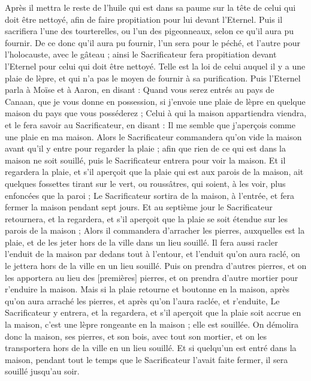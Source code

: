\begin{multicols}{2}
Après il mettra le reste de l'huile qui est dans sa paume sur la tête de celui qui doit être nettoyé, afin de faire propitiation pour lui devant l'Eternel.
Puis il sacrifiera l'une des tourterelles, ou l'un des pigeonneaux, selon ce qu'il aura pu fournir.
De ce donc qu'il aura pu fournir, l'un sera pour le péché, et l'autre pour l'holocauste, avec le gâteau ; ainsi le Sacrificateur fera propitiation devant l'Eternel pour celui qui doit être nettoyé.
Telle est la loi de celui auquel il y a une plaie de lèpre, et qui n'a pas le moyen de fournir à sa purification.
Puis l'Eternel parla à Moïse et à Aaron, en disant :
Quand vous serez entrés au pays de Canaan, que je vous donne en possession, si j'envoie une plaie de lèpre en quelque maison du pays que vous posséderez ;
Celui à qui la maison appartiendra viendra, et le fera savoir au Sacrificateur, en disant : Il me semble que j'aperçois comme une plaie en ma maison.
Alors le Sacrificateur commandera qu'on vide la maison avant qu'il y entre pour regarder la plaie ; afin que rien de ce qui est dans la maison ne soit souillé, puis le Sacrificateur entrera pour voir la maison.
Et il regardera la plaie, et s'il aperçoit que la plaie qui est aux parois de la maison, ait quelques fossettes tirant sur le vert, ou roussâtres, qui soient, à les voir, plus enfoncées que la paroi ;
Le Sacrificateur sortira de la maison, à l'entrée, et fera fermer la maison pendant sept jours.
Et au septième jour le Sacrificateur retournera, et la regardera, et s'il aperçoit que la plaie se soit étendue sur les parois de la maison ;
Alors il commandera d'arracher les pierres, auxquelles est la plaie, et de les jeter hors de la ville dans un lieu souillé.
Il fera aussi racler l'enduit de la maison par dedans tout à l'entour, et l'enduit qu'on aura raclé, on le jettera hors de la ville en un lieu souillé.
Puis on prendra d'autres pierres, et on les apportera au lieu des [premières] pierres, et on prendra d'autre mortier pour r'enduire la maison.
Mais si la plaie retourne et boutonne en la maison, après qu'on aura arraché les pierres, et après qu'on l'aura raclée, et r'enduite,
Le Sacrificateur y entrera, et la regardera, et s'il aperçoit que la plaie soit accrue en la maison, c'est une lèpre rongeante en la maison ; elle est souillée.
On démolira donc la maison, ses pierres, et son bois, avec tout son mortier, et on les transportera hors de la ville en un lieu souillé.
Et si quelqu'un est entré dans la maison, pendant tout le temps que le Sacrificateur l'avait faite fermer, il sera souillé jusqu'au soir.

\end{multicols}
